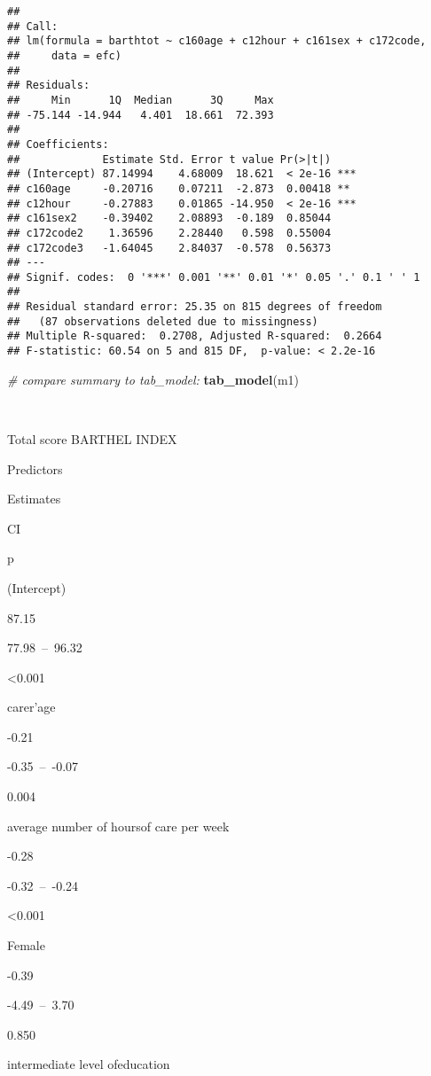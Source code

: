 \documentclass[]{article}
\newenvironment{Shaded}{\begin{snugshade}}{\end{snugshade}}
\newcommand{\KeywordTok}[1]{\textcolor[rgb]{0.13,0.29,0.53}{\textbf{#1}}}
\newcommand{\CommentTok}[1]{\textcolor[rgb]{0.56,0.35,0.01}{\textit{#1}}}
\newcommand{\NormalTok}[1]{#1}
\begin{document}
\begin{verbatim}
## 
## Call:
## lm(formula = barthtot ~ c160age + c12hour + c161sex + c172code, 
##     data = efc)
## 
## Residuals:
##     Min      1Q  Median      3Q     Max 
## -75.144 -14.944   4.401  18.661  72.393 
## 
## Coefficients:
##             Estimate Std. Error t value Pr(>|t|)    
## (Intercept) 87.14994    4.68009  18.621  < 2e-16 ***
## c160age     -0.20716    0.07211  -2.873  0.00418 ** 
## c12hour     -0.27883    0.01865 -14.950  < 2e-16 ***
## c161sex2    -0.39402    2.08893  -0.189  0.85044    
## c172code2    1.36596    2.28440   0.598  0.55004    
## c172code3   -1.64045    2.84037  -0.578  0.56373    
## ---
## Signif. codes:  0 '***' 0.001 '**' 0.01 '*' 0.05 '.' 0.1 ' ' 1
## 
## Residual standard error: 25.35 on 815 degrees of freedom
##   (87 observations deleted due to missingness)
## Multiple R-squared:  0.2708, Adjusted R-squared:  0.2664 
## F-statistic: 60.54 on 5 and 815 DF,  p-value: < 2.2e-16
\end{verbatim}

\begin{Shaded}
\begin{Highlighting}[]
\CommentTok{# compare summary to tab_model:}
\KeywordTok{tab_model}\NormalTok{(m1)}
\end{Highlighting}
\end{Shaded}

~

Total score BARTHEL INDEX

Predictors

Estimates

CI

p

(Intercept)

87.15

77.98~--~96.32

\textless{}0.001

carer'age

-0.21

-0.35~--~-0.07

0.004

average number of hoursof care per week

-0.28

-0.32~--~-0.24

\textless{}0.001

Female

-0.39

-4.49~--~3.70

0.850

intermediate level ofeducation
\end{document}
